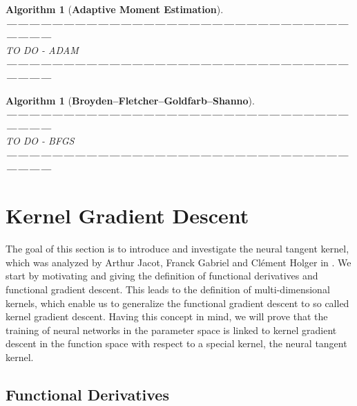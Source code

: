 \documentclass[11pt, a4paper]{article}
\newtheorem{algorithm}[theorem]{Algorithm}
\begin{document}
\begin{algorithm}[\textbf{Adaptive Moment Estimation}] \ \\
\textbf{------------------------------------------------------------------------------------------------------} \\
TO DO - ADAM \\
\textbf{------------------------------------------------------------------------------------------------------} 
\end{algorithm}

\begin{algorithm}[\textbf{Broyden–Fletcher–Goldfarb–Shanno}] \ \\
\textbf{------------------------------------------------------------------------------------------------------} \\
TO DO - BFGS \\
\textbf{------------------------------------------------------------------------------------------------------} 
\end{algorithm}

\pagebreak
\section{Kernel Gradient Descent} \label{sec:kernel}

The goal of this section is to introduce and investigate the neural tangent kernel, which was analyzed by Arthur Jacot, Franck Gabriel and Cl\'{e}ment Holger in \cite{NTK}. We start by motivating and giving the definition of functional derivatives and functional gradient descent. This leads to the definition of multi-dimensional kernels, which enable us to generalize the functional gradient descent to so called kernel gradient descent. Having this concept in mind, we will prove that the training of neural networks in the parameter space is linked to kernel gradient descent in the function space with respect to a special kernel, the neural tangent kernel.
\subsection{Functional Derivatives}
\end{document}
